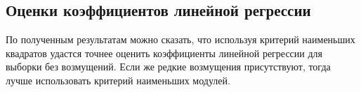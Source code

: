 \subsection{Оценки коэффициентов линейной регрессии}
	
	По полученным результатам можно сказать, что используя критерий наименьших квадратов удастся точнее оценить коэффициенты линейной регрессии для выборки без возмущений. Если же редкие возмущения присутствуют, тогда лучше использовать критерий наименьших модулей.